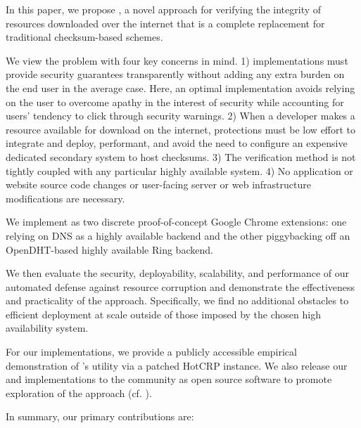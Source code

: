In this paper, we propose \SYSTEM{}, a novel approach for verifying the
integrity of resources downloaded over the internet that is a complete
replacement for traditional checksum-based schemes.

We view the problem with four key concerns in mind. 1) \SYSTEM{} implementations
must provide security guarantees transparently without adding any extra burden
on the end user in the average case. Here, an optimal implementation avoids
relying on the user to overcome apathy in the interest of security while
accounting for users' tendency to click through security warnings. 2) When a
developer makes a resource available for download on the internet, \SYSTEM{}
protections must be low effort to integrate and deploy, performant, and avoid
the need to configure an expensive dedicated secondary system to host checksums.
3) The verification method is not tightly coupled with any particular highly
available system. 4) No application or website source code changes or
user-facing server or web infrastructure modifications are necessary.

We implement \SYSTEM{} as two discrete proof-of-concept Google Chrome
extensions: one relying on DNS as a highly available backend and the other
piggybacking off an OpenDHT-based highly available Ring backend.

We then evaluate the security, deployability, scalability, and performance of
our automated defense against resource corruption and demonstrate the
effectiveness and practicality of the \SYSTEM{} approach. Specifically, we find
no additional obstacles to efficient deployment at scale outside of those
imposed by the chosen high availability system.

For our implementations, we provide a publicly accessible empirical
demonstration of \SYSTEM{}'s utility via a patched HotCRP instance. We also
release our \DNSSYS{} and \DHTSYS{} implementations to the community as open
source software to promote exploration of the \SYSTEM{} approach (cf.
).

In summary, our primary contributions are:

